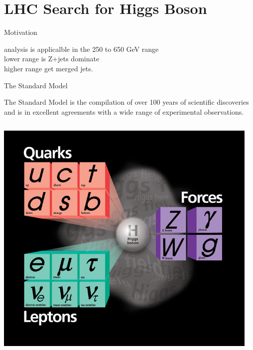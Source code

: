 \section{LHC Search for Higgs Boson}


\begin{frame}{Motivation}
\begin{center}
analysis is applicalble in the 250 to 650 GeV range
\\
lower range is Z+jets dominate\\
higher range get merged jets.

\end{center}
\end{frame}


\begin{frame}{The Standard Model}
\begin{center}
The Standard Model is the compilation of over 100 years of scientific discoveries and is in excellent agreements with a wide range of experimental observations.
\\
\vspace{1em}
\begin{columns}
  \begin{column}{0.5\textwidth}
    \includegraphics[width=1.0\textwidth]{images/standard_model_particles.jpg}
  \end{column}
  \begin{column}{0.5\textwidth}
\begin{center}

\end{center}
\end{column}
\end{columns}
\end{center}
\end{frame}
